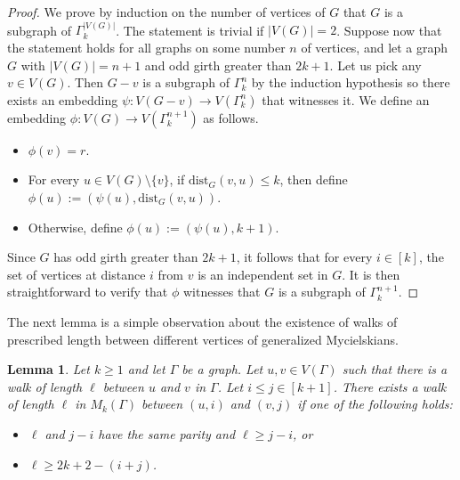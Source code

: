 \documentclass{article}
\newtheorem{lemma}[theorem]{Lemma}
\newcommand{\dist}{\text{dist}}
\begin{document}
\begin{proof}
    We prove by induction on the number of vertices of $G$ that $G$ is a subgraph of $\Gamma_k^{|V(G)|}$.
    The statement is trivial if $|V(G)|=2$.
    Suppose now that the statement holds for all graphs on some number $n$ of vertices, and let a graph $G$ with $|V(G)| = n+1$ and odd girth greater than $2k+1$.
    Let us pick any $v \in V(G)$.
    Then $G-v$ is a subgraph of $\Gamma_k^n$ by the induction hypothesis so there exists an embedding $\psi : V(G-v) \to V(\Gamma_k^n)$ that witnesses it.
    We define an embedding $\phi : V(G) \to V(\Gamma_k^{n+1})$ as follows. \begin{itemize}
        \item $\phi(v) = r$.
        \item For every $u\in V(G)\setminus \{v\}$, if $\dist_G(v, u) \leq k$, then define $\phi(u) := (\psi(u), \dist_G(v, u))$.
        \item Otherwise, define $\phi(u) := (\psi(u), k+1)$.
    \end{itemize}
    Since $G$ has odd girth greater than $2k+1$, it follows that for every $i \in [k]$, the set of vertices at distance $i$ from $v$ is an independent set in $G$. It is then straightforward to verify that $\phi$ witnesses that $G$ is a subgraph
    of $\Gamma_k^{n+1}$.
\end{proof}
The next lemma is a simple observation about the existence of walks of prescribed length between different vertices of generalized Mycielskians.
\begin{lemma}\label{lem:exists-walk}
    Let $k \geq 1$ and let $\Gamma$ be a graph.
    Let $u, v \in V(\Gamma)$ such that there is a walk of length $\ell$ between $u$ and $v$ in $\Gamma$.
    Let $i \leq j \in [k+1]$.
    There exists a walk of length $\ell$ in $M_k(\Gamma)$ between $(u, i)$ and $(v, j)$ if one of the following holds: \begin{itemize}
        \item $\ell$ and $j-i$ have the same parity and $\ell \geq j-i$, or
        \item $\ell \geq 2k+2-(i+j)$.
    \end{itemize}
\end{lemma}
\end{document}

